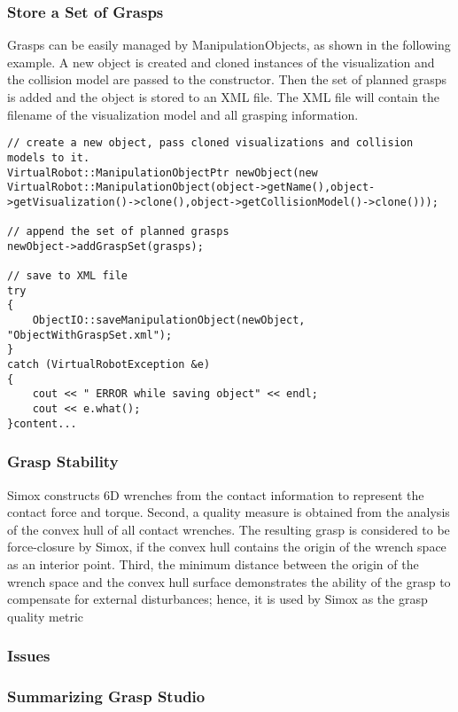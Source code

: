 \subsubsection{Store a Set of Grasps}
Grasps can be easily managed by ManipulationObjects, as shown in the following example. A new object is created and cloned instances of the visualization and the collision model are passed to the constructor. Then the set of planned grasps is added and the object is stored to an XML file. The XML file will contain the filename of the visualization model and all grasping information.
\begin{lstlisting}
// create a new object, pass cloned visualizations and collision models to it.
VirtualRobot::ManipulationObjectPtr newObject(new VirtualRobot::ManipulationObject(object->getName(),object->getVisualization()->clone(),object->getCollisionModel()->clone()));

// append the set of planned grasps
newObject->addGraspSet(grasps);

// save to XML file
try
{
    ObjectIO::saveManipulationObject(newObject, "ObjectWithGraspSet.xml");
}
catch (VirtualRobotException &e)
{
    cout << " ERROR while saving object" << endl;
    cout << e.what();
}content...
\end{lstlisting}
\subsubsection{Grasp Stability}
Simox constructs 6D wrenches from the contact information to represent the contact force and torque.  Second, a quality measure is obtained from the analysis of the convex hull of all contact wrenches. The resulting grasp is considered to be force-closure by Simox, if the convex hull contains the origin of the wrench space as an interior point.  Third, the minimum distance between the origin of the wrench space and the convex hull surface demonstrates the ability of the grasp to compensate for external disturbances; hence, it is used by Simox as the grasp
quality metric
\subsubsection{Issues}
\subsubsection*{Summarizing Grasp Studio}
